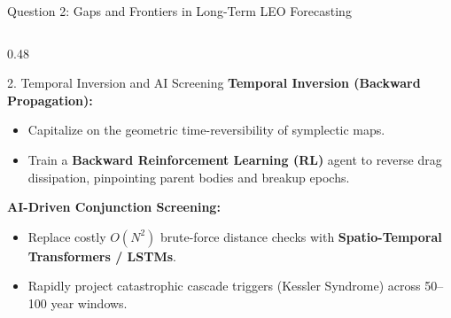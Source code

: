 \documentclass[aspectratio=169,10pt]{beamer}
\begin{document}
\begin{frame}{Question 2: Gaps and Frontiers in Long-Term LEO Forecasting}
\begin{columns}[t]
        \begin{column}{0.48\textwidth}
            \begin{exampleblock}{2. Temporal Inversion and AI Screening}
                \small
                \textbf{Temporal Inversion (Backward Propagation):}
                \begin{itemize}
                    \setlength{\itemsep}{2pt}
                    \item Capitalize on the geometric time-reversibility of symplectic maps.
                    \item Train a \textbf{Backward Reinforcement Learning (RL)} agent to reverse drag dissipation, pinpointing parent bodies and breakup epochs.
                \end{itemize}
                \vspace{0.12cm}
                \textbf{AI-Driven Conjunction Screening:}
                \begin{itemize}
                    \setlength{\itemsep}{2pt}
                    \item Replace costly $O(N^2)$ brute-force distance checks with \textbf{Spatio-Temporal Transformers / LSTMs}.
                    \item Rapidly project catastrophic cascade triggers (Kessler Syndrome) across 50--100 year windows.
                \end{itemize}
            \end{exampleblock}
        \end{column}
    \end{columns}
\end{frame}
\end{document}
